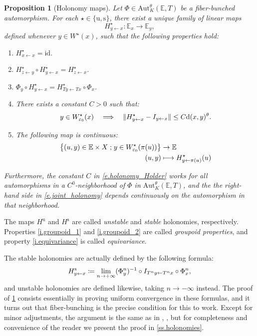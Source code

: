 \documentclass[JEP,XML,SOM,Unicode]{cedram}
\def\vcentcolon{\mathrel{\mathop\ordinarycolon}}
\providecommand\ordinarycolon{:}
\providecommand*\coloneqq{\vcentcolon\mathrel{\mkern-1.2mu}=}
\newcommand\mto{\mathchoice{\longmapsto}{\mapsto}{\mapsto}{\mapsto}}
\newcommand\implique{\mathchoice{\Longrightarrow}{\Rightarrow}{\Rightarrow}{\Rightarrow}}
\theoremstyle{plain}
\newtheorem{proposition}[theorem]{Proposition}
\theoremstyle{definition}
\newcommand{\EE}{\mathbb{E}}
\newcommand{\id}{\mathrm{id}}
\newcommand{\st}{\;\mathord{;}\;}
\newcommand{\dd}{\mathrm{d}}
\newcommand{\uu}{\mathrm{u}}
\renewcommand{\ss}{\mathrm{s}}
\newcommand{\Aut}{\mathrm{Aut}}
\let\epsilon\varepsilon
\begin{document}
\begin{proposition}[Holonomy maps]\label{p.holonomies}
Let	$\Phi \in \Aut^\theta_K(\EE,T)$ be a fiber-bunched automorphism.
For each $\star \in \{\uu,\ss\}$, there exist a unique family of linear maps
\[
H^\star_{y \gets x} \colon \EE_x \to \EE_y,
\]
defined whenever $y \in W^\star(x)$,
such that the following properties hold:
\begin{enumerate}
\item\label{i.groupoid_1}
$H^\star_{x \gets x} = \id$.
\item\label{i.groupoid_2}
$H^\star_{z \gets y} \circ H^\star_{y \gets x} = H^\star_{z \gets x}$.
\item\label{i.equivariance}
$\Phi_y \circ H^\star_{y \gets x} = H^\star_{Ty \gets Tx} \circ \Phi_x$.
\item\label{i.holonomy_Holder}
There exists a constant $C>0$ such that:
\begin{equation}\label{e.holonomy_Holder}
y \in W^\star_{\epsilon_0}(x) \quad \implique \quad
\| H^\star_{y \gets x} - I_{y \gets x} \| \le C \dd(x,y)^\theta.
\end{equation}
\item\label{i.holonomy_cont}
The following map is continuous:
\begin{equation}\label{e.joint_holonomy}
\begin{aligned}
\big\{ (u,y) \in \EE \times X \st y \in W^\star_{\epsilon_0}(\pi(u)) \big\} &\to \EE \\
(u,y) &\mto H^\star_{y \gets \pi(u)} (u)
\end{aligned}
\end{equation}
\end{enumerate}
Furthermore, the constant $C$ in \eqref{e.holonomy_Holder} works for all automorphisms in a $C^0$\nobreakdash-neighbor\-hood of $\Phi$ in $\Aut^\theta_K(\EE,T)$, and the the right-hand side in \eqref{e.joint_holonomy} depends continuously on the automorphism in that neighborhood.
\end{proposition}

The maps $H^\uu$ and $H^\ss$ are called \emph{unstable} and \emph{stable} holonomies, respectively.
Properties \eqref{i.groupoid_1} and \eqref{i.groupoid_2} are called \emph{groupoid properties}, and property \eqref{i.equivariance} is called \emph{equivariance}.

The stable holonomies are actually defined by the following formula:
\begin{equation*}
H^\ss_{y \gets x} \coloneqq \lim_{n \to + \infty} (\Phi_y^n)^{-1} \circ I_{T^n y \gets T^n x} \circ \Phi_x^n,
\end{equation*}
and unstable holonomies are defined likewise, taking $n \to -\infty$ instead.
The proof of \cref{p.holonomies} consists essentially in proving uniform convergence in these formulas, and it turns out that fiber-bunching is the precise condition for this to work.
Except for minor adjustments, the argument is the same as in \cite[\S1.4]{BGV}, \cite[\S4.1]{KalSad}, but for completeness and convenience of the reader we present the proof in \cref{ss.holonomies}.
\end{document}
